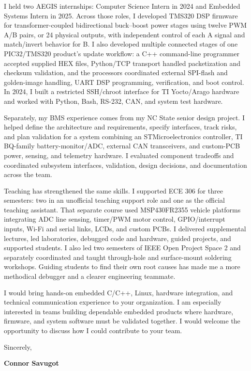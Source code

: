\documentclass[10pt,letterpaper]{article}
\newcommand{\TargetCompany}{your organization}
\newcommand{\InterestSentence}{I am especially interested in teams building dependable embedded products where hardware, firmware, and system software must be validated together.}
\begin{document}
I held two AEGIS internships: Computer Science Intern in 2024 and Embedded Systems Intern in 2025. Across those roles, I developed TMS320 DSP firmware for transformer-coupled bidirectional buck--boost power stages using twelve PWM A/B pairs, or 24 physical outputs, with independent control of each A signal and match/invert behavior for B. I also developed multiple connected stages of one PIC32/TMS320 product's update workflow: a C++ command-line programmer accepted supplied HEX files, Python/TCP transport handled packetization and checksum validation, and the processors coordinated external SPI-flash and golden-image handling, UART DSP programming, verification, and boot control. In 2024, I built a restricted SSH/chroot interface for TI Yocto/Arago hardware and worked with Python, Bash, RS-232, CAN, and system test hardware.

Separately, my BMS experience comes from my NC State senior design project. I helped define the architecture and requirements, specify interfaces, track risks, and plan validation for a system combining an STMicroelectronics controller, TI BQ-family battery-monitor/ADC, external CAN transceivers, and custom-PCB power, sensing, and telemetry hardware. I evaluated component tradeoffs and coordinated subsystem interfaces, validation, design decisions, and documentation across the team.

Teaching has strengthened the same skills. I supported ECE 306 for three semesters: two in an unofficial teaching support role and one as the official teaching assistant. That separate course used MSP430FR2355 vehicle platforms integrating ADC line sensing, timer/PWM motor control, GPIO/interrupt inputs, Wi-Fi and serial links, LCDs, and custom PCBs. I delivered supplemental lectures, led laboratories, debugged code and hardware, guided projects, and supported students. I also led two semesters of IEEE Open Project Space 2 and separately coordinated and taught through-hole and surface-mount soldering workshops. Guiding students to find their own root causes has made me a more methodical debugger and a clearer engineering teammate.

I would bring hands-on embedded C/C++, Linux, hardware integration, and technical communication experience to \TargetCompany. \InterestSentence{} I would welcome the opportunity to discuss how I could contribute to your team.

Sincerely,

\textbf{Connor Savugot}
\end{document}
